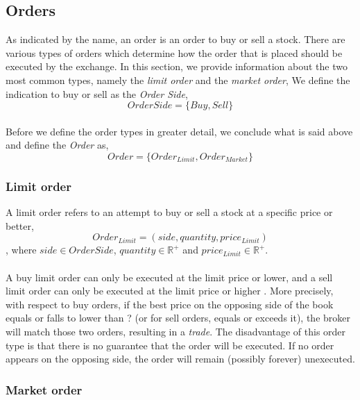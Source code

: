 \subsection{Orders}
\label{sec:orders}

As indicated by the name, an order is an order to buy or sell a stock.
There are various types of orders which determine how the order that is placed should be executed by the exchange.
In this section, we provide information about the two most common types, namely the \textit{limit order} and the \textit{market order},
We define the indication to buy or sell as the \textit{Order Side},
\begin{equation}\label{eq:order-side}
    OrderSide=\{Buy, Sell\}
\end{equation}
\\
Before we define the order types in greater detail, we conclude what is said above and define the \textit{Order} as,
\begin{equation}\label{eq:order}
Order=\{Order_{Limit}, Order_{Market}\}
\end{equation}

\subsubsection{Limit order}
\label{sec:limit-order}

A limit order refers to an attempt to buy or sell a stock at a specific price or better,
\begin{equation}\label{eq:order-limit}
    Order_{Limit}=(side, quantity, price_{Limit})
\end{equation}
, where $side \in OrderSide$, $quantity \in \mathbb{R^+}$ and $price_{Limit} \in \mathbb{R^+}$.
\\
\\
A buy limit order can only be executed at the limit price or lower, and a sell limit order can only be executed at the limit price or higher \cite{sec-limit-order}.
More precisely, with respect to buy orders, if the best price on the opposing side of the book equals or falls to lower than ? (or for sell orders, equals or exceeds it), the broker will match those two orders, resulting in a \textit{trade}.
The disadvantage of this order type is that there is no guarantee that the order will be executed.
If no order appears on the opposing side, the order will remain (possibly forever) unexecuted.

\subsubsection{Market order}
\label{sec:market-order}

